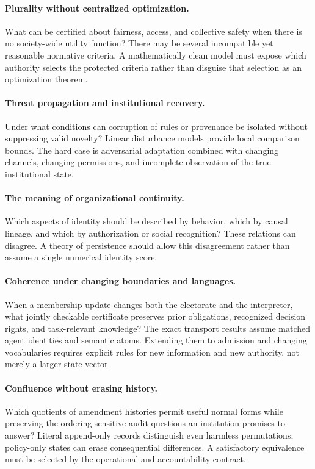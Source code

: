 \documentclass[11pt,letterpaper]{article}
\theoremstyle{plain}
\theoremstyle{definition}
\theoremstyle{remark}
\begin{document}
\paragraph{Plurality without centralized optimization.}
What can be certified about fairness, access, and collective safety when there is no society-wide utility function? There may be several incompatible yet reasonable normative criteria. A mathematically clean model must expose which authority selects the protected criteria rather than disguise that selection as an optimization theorem.

\paragraph{Threat propagation and institutional recovery.}
Under what conditions can corruption of rules or provenance be isolated without suppressing valid novelty? Linear disturbance models provide local comparison bounds. The hard case is adversarial adaptation combined with changing channels, changing permissions, and incomplete observation of the true institutional state.

\paragraph{The meaning of organizational continuity.}
Which aspects of identity should be described by behavior, which by causal lineage, and which by authorization or social recognition? These relations can disagree. A theory of persistence should allow this disagreement rather than assume a single numerical identity score.

\paragraph{Coherence under changing boundaries and languages.}
When a membership update changes both the electorate and the interpreter, what jointly checkable certificate preserves prior obligations, recognized decision rights, and task-relevant knowledge? The exact transport results assume matched agent identities and semantic atoms. Extending them to admission and changing vocabularies requires explicit rules for new information and new authority, not merely a larger state vector.

\paragraph{Confluence without erasing history.}
Which quotients of amendment histories permit useful normal forms while preserving the ordering-sensitive audit questions an institution promises to answer? Literal append-only records distinguish even harmless permutations; policy-only states can erase consequential differences. A satisfactory equivalence must be selected by the operational and accountability contract.
\end{document}
